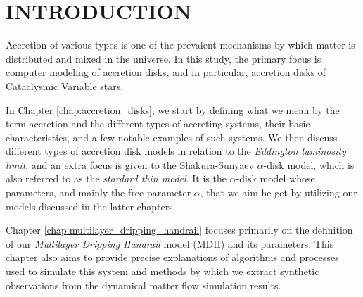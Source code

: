 \chapter{INTRODUCTION}
\thispagestyle{empty}


Accretion of various types is one of the prevalent mechanisms by which matter is distributed and mixed in the universe. In this study, the primary focus is computer modeling of accretion disks, and in particular, accretion disks of Cataclysmic Variable stars.

In Chapter \ref{chap:accretion_disks}, we start by defining what we mean by the term accretion and the different types of accreting systems, their basic characteristics, and a few notable examples of such systems. We then discuss different types of accretion disk models in relation to the \emph{Eddington luminosity limit}, and an extra focus is given to the Shakura-Sunyaev $\alpha$-disk model, which is also referred to as the \emph{stardard thin model}. It is the $\alpha$-disk model whose parameters, and mainly the free parameter $\alpha$, that we aim he get by utilizing our models discussed in the latter chapters.

Chapter \ref{chap:multilayer_dripping_handrail} focuses primarily on the definition of our \emph{Multilayer Dripping Handrail} model (MDH) and its parameters. This chapter also aims to provide precise explanations of algorithms and processes used to simulate this system and methods by which we extract synthetic observations from the dynamical matter flow simulation results.

